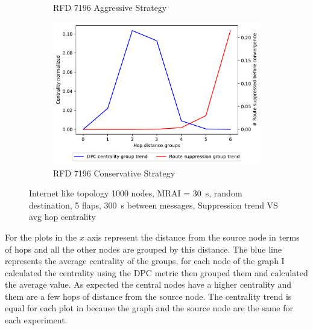 \begin{figure}[h]
\begin{subfigure}[b]{0.325\textwidth}
         \caption{RFD 7196 Aggressive Strategy}
         \label{fig:1000_7196RFDA_centVSsup}
     \end{subfigure}
     \hfill
     \begin{subfigure}[b]{0.325\textwidth}
         \centering
         \includegraphics[width=\textwidth]{images/RFD/miceVSelephants/mice/cisco_1000_RFD_7196_conservative_nodeConvergence_centVSsup_trend.pdf}
         \caption{RFD 7196 Conservative Strategy}
         \label{fig:1000_7196RFDC_centVSsup}
     \end{subfigure}
		\caption{Internet like topology \num{1000} nodes, \ac{MRAI} = \SI{30}{\second}, random destination, \num{5} flaps, \SI{300}{\second} between messages, Suppression trend VS avg hop centrality}
        \label{fig:1000_RFD_centVSsup}
\end{figure}


For the plots in  the $x$ axis represent the distance
from the source node in terms of hops and all the other nodes are grouped by this
distance.
The blue line represents the average centrality of the groups, for each node of the
graph I calculated the centrality using the \ac{DPC} metric then grouped them
and calculated the average value.
As expected the central nodes have a higher centrality and them are a few hops
of distance
from the source node.
The centrality trend is equal for each plot in 
because the graph and the source node are the same for each experiment.

